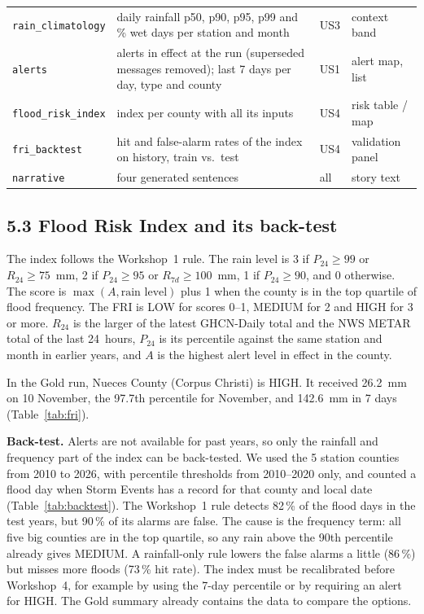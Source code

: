 \documentclass[stu, 12pt, letterpaper, donotrepeattitle, floatsintext, natbib]{apa7}
\begin{document}
{\begin{xltabular}{\textwidth}{>{\raggedright\arraybackslash}p{2.7cm} >{\raggedright\arraybackslash}X >{\raggedright\arraybackslash}p{1.0cm} >{\raggedright\arraybackslash}p{3.0cm}}
\texttt{rain\_climatology} & daily rainfall p50, p90, p95, p99 and \% wet days per station and month & US3 & context band \\
\texttt{alerts} & alerts in effect at the run (superseded messages removed); last 7 days per day, type and county & US1 & alert map, list \\
\texttt{flood\_risk\_index} & index per county with all its inputs & US4 & risk table / map \\
\texttt{fri\_backtest} & hit and false-alarm rates of the index on history, train vs.\ test & US4 & validation panel \\
\texttt{narrative} & four generated sentences & all & story text \\
\end{xltabular}}

\subsection{5.3 Flood Risk Index and its back-test}
The index follows the Workshop~1 rule. The rain level is 3 if $P_{24} \geq 99$ or $R_{24} \geq 75$~mm, 2 if $P_{24} \geq 95$ or $R_{7d} \geq 100$~mm, 1 if $P_{24} \geq 90$, and 0 otherwise. The score is $\max(A, \text{rain level})$ plus 1 when the county is in the top quartile of flood frequency. The FRI is LOW for scores 0--1, MEDIUM for 2 and HIGH for 3 or more. $R_{24}$ is the larger of the latest GHCN-Daily total and the NWS METAR total of the last 24~hours, $P_{24}$ is its percentile against the same station and month in earlier years, and $A$ is the highest alert level in effect in the county.

In the Gold run, Nueces County (Corpus Christi) is HIGH. It received 26.2~mm on 10 November, the 97.7th percentile for November, and 142.6~mm in 7 days (Table~\ref{tab:fri}).


\noindent \textbf{Back-test.} Alerts are not available for past years, so only the rainfall and frequency part of the index can be back-tested. We used the 5 station counties from 2010 to 2026, with percentile thresholds from 2010--2020 only, and counted a flood day when Storm Events has a record for that county and local date (Table~\ref{tab:backtest}). The Workshop~1 rule detects 82\,\% of the flood days in the test years, but 90\,\% of its alarms are false. The cause is the frequency term: all five big counties are in the top quartile, so any rain above the 90th percentile already gives MEDIUM. A rainfall-only rule lowers the false alarms a little (86\,\%) but misses more floods (73\,\% hit rate). The index must be recalibrated before Workshop~4, for example by using the 7-day percentile or by requiring an alert for HIGH. The Gold summary already contains the data to compare the options.

\end{document}

